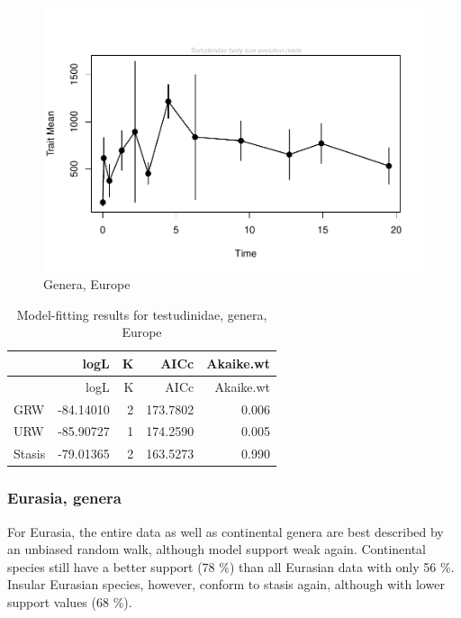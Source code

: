 \begin{figure}[H]
	\centering
	\includegraphics{MA_JJ_files/figure-latex/paleoTSEurope-1.pdf}
	\caption{Genera, Europe}
	\label{fig:pTSEu}
\end{figure}

\begin{longtable}[]{@{}lrrrr@{}}
	\caption{Model-fitting results for testudinidae, genera,
		Europe}
	\label{tab:pTSEuEM}\tabularnewline
	\toprule
	& logL & K & AICc & Akaike.wt\tabularnewline
	\midrule
	\endfirsthead
	\toprule
	& logL & K & AICc & Akaike.wt\tabularnewline
	\midrule
	\endhead
	GRW & -84.14010 & 2 & 173.7802 & 0.006\tabularnewline
	URW & -85.90727 & 1 & 174.2590 & 0.005\tabularnewline
	Stasis & -79.01365 & 2 & 163.5273 & 0.990\tabularnewline
	\bottomrule
\end{longtable}

\FloatBarrier



\subsubsection{Eurasia,	genera}\label{eurasia-genera}


For Eurasia, the entire data as well as continental genera are best described by an unbiased random walk, although model support weak again. Continental species still have a better support (78 \%) than all Eurasian data with only 56 \%. Insular Eurasian species, however, conform to stasis again, although with lower support values (68 \%).



